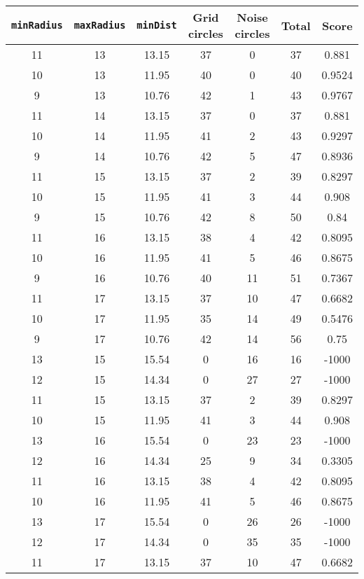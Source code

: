 \documentclass[letterpaper, 12pt]{article}
\begin{document}
\begin{longtable}{|c|c|c|c|c|c|c|}
\hline
\textbf{\texttt{minRadius}} & \textbf{\texttt{maxRadius}} & \textbf{\texttt{minDist}} & \textbf{Grid circles} & \textbf{Noise circles} & \textbf{Total} & \textbf{Score} \\
\hline
11 & 13 & 13.15 & 37 & 0 & 37 & 0.881 \\
\hline
10 & 13 & 11.95 & 40 & 0 & 40 & 0.9524 \\
\hline
9 & 13 & 10.76 & 42 & 1 & 43 & 0.9767 \\
\hline
11 & 14 & 13.15 & 37 & 0 & 37 & 0.881 \\
\hline
10 & 14 & 11.95 & 41 & 2 & 43 & 0.9297 \\
\hline
9 & 14 & 10.76 & 42 & 5 & 47 & 0.8936 \\
\hline
11 & 15 & 13.15 & 37 & 2 & 39 & 0.8297 \\
\hline
10 & 15 & 11.95 & 41 & 3 & 44 & 0.908 \\
\hline
9 & 15 & 10.76 & 42 & 8 & 50 & 0.84 \\
\hline
11 & 16 & 13.15 & 38 & 4 & 42 & 0.8095 \\
\hline
10 & 16 & 11.95 & 41 & 5 & 46 & 0.8675 \\
\hline
9 & 16 & 10.76 & 40 & 11 & 51 & 0.7367 \\
\hline
11 & 17 & 13.15 & 37 & 10 & 47 & 0.6682 \\
\hline
10 & 17 & 11.95 & 35 & 14 & 49 & 0.5476 \\
\hline
9 & 17 & 10.76 & 42 & 14 & 56 & 0.75 \\
\hline
13 & 15 & 15.54 & 0 & 16 & 16 & -1000 \\
\hline
12 & 15 & 14.34 & 0 & 27 & 27 & -1000 \\
\hline
11 & 15 & 13.15 & 37 & 2 & 39 & 0.8297 \\
\hline
10 & 15 & 11.95 & 41 & 3 & 44 & 0.908 \\
\hline
13 & 16 & 15.54 & 0 & 23 & 23 & -1000 \\
\hline
12 & 16 & 14.34 & 25 & 9 & 34 & 0.3305 \\
\hline
11 & 16 & 13.15 & 38 & 4 & 42 & 0.8095 \\
\hline
10 & 16 & 11.95 & 41 & 5 & 46 & 0.8675 \\
\hline
13 & 17 & 15.54 & 0 & 26 & 26 & -1000 \\
\hline
12 & 17 & 14.34 & 0 & 35 & 35 & -1000 \\
\hline
11 & 17 & 13.15 & 37 & 10 & 47 & 0.6682 \\
\hline

\end{longtable}
\end{document}
